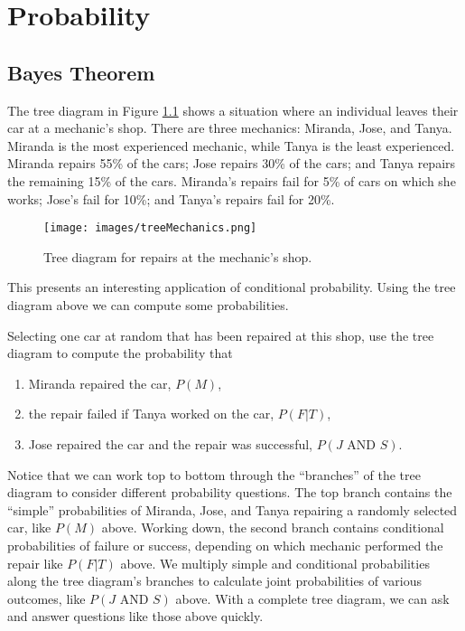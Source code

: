 \setcounter{chapter}{2}
\chapter{Probability}

\section{Bayes Theorem}

The tree diagram in Figure \ref{fig:treeMechanics} shows a situation where an individual leaves their car at a mechanic's shop. There are three mechanics: Miranda, Jose, and Tanya. Miranda is the most experienced mechanic, while Tanya is the least experienced. Miranda repairs 55\% of the cars; Jose repairs 30\% of the cars; and Tanya repairs the remaining 15\% of the cars. Miranda's repairs fail for 5\% of cars on which she works; Jose's fail for 10\%; and Tanya's repairs fail for 20\%.

\begin{figure}
\centering
\texttt{[image: images/treeMechanics.png]}
\caption{Tree diagram for repairs at the mechanic's shop.}
\label{fig:treeMechanics}
\end{figure}

This presents an interesting application of conditional probability. Using the tree diagram above we can compute some probabilities.

\begin{example}
Selecting one car at random that has been repaired at this shop, use the tree diagram to compute the probability that
\begin{enumerate}
 \item Miranda repaired the car, \(P(M)\),
 \item the repair failed if Tanya worked on the car, \(P(F|T)\),
 \item Jose repaired the car and the repair was successful, \(P(J\text{ AND }S)\).
\end{enumerate}

Notice that we can work top to bottom through the ``branches'' of the tree diagram to consider different probability questions. The top branch contains the ``simple'' probabilities of Miranda, Jose, and Tanya repairing a randomly selected car, like \(P(M)\) above. Working down, the second branch contains conditional probabilities of failure or success, depending on which mechanic performed the repair like \(P(F|T)\) above. We multiply simple and conditional probabilities along the tree diagram's branches to calculate joint probabilities of various outcomes, like \(P(J\text{ AND }S)\) above. With a complete tree diagram, we can ask and answer questions like those above quickly.
\end{example}

